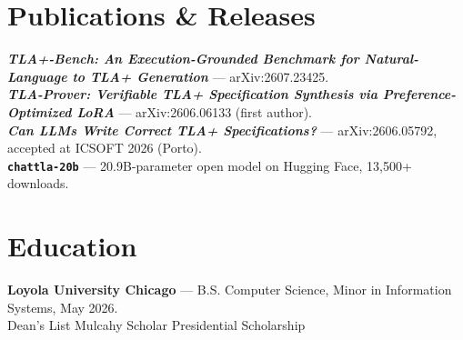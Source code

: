 \documentclass[letterpaper,10pt]{article}
\begin{document}
\section*{Publications \& Releases}
\begin{itemize}[leftmargin=0.15in, label={}]
  \small{
    \item{\textbf{\emph{TLA+-Bench: An Execution-Grounded Benchmark for Natural-Language to TLA+ Generation}} --- arXiv:2607.23425. \\
    \textbf{\emph{TLA-Prover: Verifiable TLA+ Specification Synthesis via Preference-Optimized LoRA}} --- arXiv:2606.06133 (first author). \\
    \textbf{\emph{Can LLMs Write Correct TLA+ Specifications?}} --- arXiv:2606.05792, accepted at ICSOFT 2026 (Porto). \\
    \textbf{\texttt{chattla-20b}} --- 20.9B-parameter open model on Hugging Face, 13{,}500+ downloads.}
  }
\end{itemize}

\section*{Education}
\begin{itemize}[leftmargin=0.15in, label={}]
  \small{
    \item{\textbf{Loyola University Chicago} --- B.S. Computer Science, Minor in Information Systems, May 2026. \\
    Dean's List \textbar{} Mulcahy Scholar \textbar{} Presidential Scholarship}
  }
\end{itemize}
\end{document}
